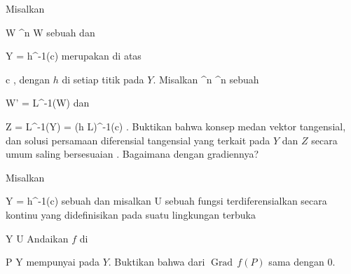 {}
{

Misalkan

\mavergleichskette
{\vergleichskette
{ W
}
{ \subseteq }{ \R^n
}
{  }{
}
{    }{
}
{   }{
}
}
{}{}{}
 { W } { \R
} {}
sebuah
dan

\mavergleichskette
{\vergleichskette
{ Y
}
{ = }{ h^{-1}(c)
}
{  }{
}
{    }{
}
{   }{
}
}
{}{}{}
merupakan
di atas

\mavergleichskette
{\vergleichskette
{ c
}
{ \in }{ \R
}
{  }{
}
{    }{
}
{   }{
}
}
{}{}{,}
dengan $h$
di setiap titik pada $Y$. Misalkan
 {\R^n } { \R^n
} {}
sebuah

\mavergleichskette
{\vergleichskette
{ W'
}
{ = }{ L^{-1}(W)
}
{  }{
}
{    }{
}
{   }{
}
}
{}{}{}
dan

\mavergleichskettedisp
{\vergleichskette
{ Z
}
{ =} { L^{-1}(Y)
}
{ =} { (h \circ L)^{-1}(c)
}
{ } {
}
{ } {
}
}
{}{}{.}
Buktikan bahwa konsep
medan vektor tangensial, dan solusi persamaan diferensial tangensial yang terkait pada $Y$ dan $Z$ secara umum saling bersesuaian
 {} {.}
Bagaimana dengan gradiennya?

}
{} {}

{}
{

Misalkan

\mavergleichskette
{\vergleichskette
{ Y
}
{ = }{ h^{-1}(c)
}
{  }{
}
{    }{
}
{   }{
}
}
{}{}{}
sebuah
dan misalkan
 { U} { \R
} {}
sebuah fungsi terdiferensialkan secara kontinu yang didefinisikan pada suatu lingkungan terbuka

\mavergleichskette
{\vergleichskette
{ Y
}
{ \subseteq }{ U
}
{  }{
}
{    }{
}
{   }{
}
}
{}{}{}
Andaikan $f$ di

\mavergleichskette
{\vergleichskette
{ P
}
{ \in }{ Y
}
{  }{
}
{    }{
}
{   }{
}
}
{}{}{}
mempunyai
pada $Y$. Buktikan bahwa
dari $\operatorname{Grad} \,  f  (  P )$ sama dengan $0$.

}
{} {}

